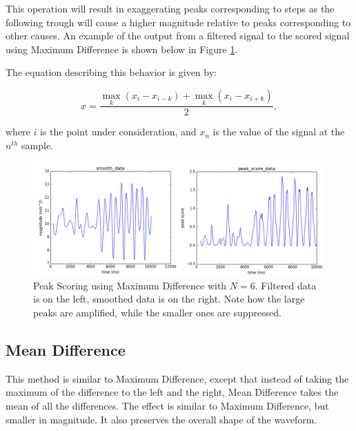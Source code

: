                 This operation will result in exaggerating peaks corresponding to steps as the following trough will cause a higher magnitude relative to peaks corresponding to other causes. An example of the output from a filtered signal to the scored signal using Maximum Difference is shown below in Figure \ref{max_diff_score}.

                The equation describing this behavior is given by:

                \begin{equation}
                x = \frac{\max\limits_k{(x_i - x_{i-k})} + \max\limits_k{(x_i - x_{i+k})}}{2},
                \end{equation}

                where $i$ is the point under consideration, and $x_n$ is the value of the signal at the $n^{th}$ sample.

                \begin{figure}[!th]
                    \includegraphics[width=\textwidth]{Images/max_diff_score.png}
                    \centering
                    \caption{Peak Scoring using Maximum Difference with $N=6$. Filtered data is on the left, smoothed data is on the right. Note how the large peaks are amplified, while the smaller ones are suppressed.}
                    \label{max_diff_score}
                \end{figure}                 

            \subsection{Mean Difference}

                This method is similar to Maximum Difference, except that instead of taking the maximum of the difference to the left and the right, Mean Difference takes the mean of all the differences. The effect is similar to Maximum Difference, but smaller in magnitude. It also preserves the overall shape of the waveform.

